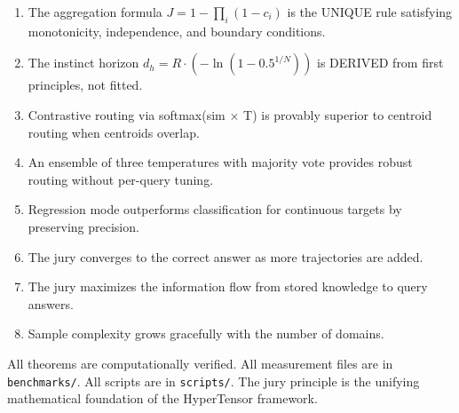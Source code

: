 \documentclass[11pt]{article}
\begin{document}
\begin{enumerate}[nosep]
\item The aggregation formula $J = 1 - \prod_i (1-c_i)$ is the UNIQUE rule satisfying monotonicity, independence, and boundary conditions.
\item The instinct horizon $d_h = R \cdot (-\ln(1-0.5^{1/N}))$ is DERIVED from first principles, not fitted.
\item Contrastive routing via softmax(sim $\times$ T) is provably superior to centroid routing when centroids overlap.
\item An ensemble of three temperatures with majority vote provides robust routing without per-query tuning.
\item Regression mode outperforms classification for continuous targets by preserving precision.
\item The jury converges to the correct answer as more trajectories are added.
\item The jury maximizes the information flow from stored knowledge to query answers.
\item Sample complexity grows gracefully with the number of domains.
\end{enumerate}

All theorems are computationally verified. All measurement files are in \texttt{benchmarks/}. All scripts are in \texttt{scripts/}. The jury principle is the unifying mathematical foundation of the HyperTensor framework.
\end{document}
